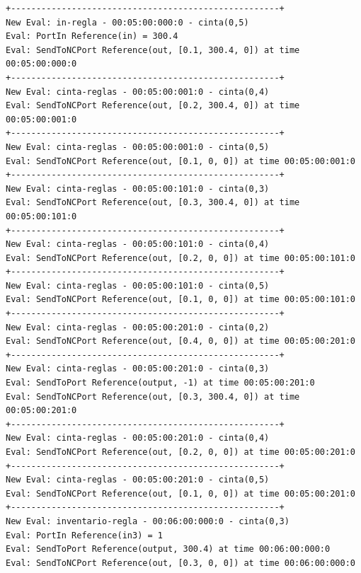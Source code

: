 \documentclass[10pt]{article}
\begin{document}
\begin{minipage}{1\textwidth}
	\centering
	\begin{lstlisting}
+-----------------------------------------------------+
New Eval: in-regla - 00:05:00:000:0 - cinta(0,5)
Eval: PortIn Reference(in) = 300.4
Eval: SendToNCPort Reference(out, [0.1, 300.4, 0]) at time 00:05:00:000:0
+-----------------------------------------------------+
New Eval: cinta-reglas - 00:05:00:001:0 - cinta(0,4)
Eval: SendToNCPort Reference(out, [0.2, 300.4, 0]) at time 00:05:00:001:0
+-----------------------------------------------------+
New Eval: cinta-reglas - 00:05:00:001:0 - cinta(0,5)
Eval: SendToNCPort Reference(out, [0.1, 0, 0]) at time 00:05:00:001:0
+-----------------------------------------------------+
New Eval: cinta-reglas - 00:05:00:101:0 - cinta(0,3)
Eval: SendToNCPort Reference(out, [0.3, 300.4, 0]) at time 00:05:00:101:0
+-----------------------------------------------------+
New Eval: cinta-reglas - 00:05:00:101:0 - cinta(0,4)
Eval: SendToNCPort Reference(out, [0.2, 0, 0]) at time 00:05:00:101:0
+-----------------------------------------------------+
New Eval: cinta-reglas - 00:05:00:101:0 - cinta(0,5)
Eval: SendToNCPort Reference(out, [0.1, 0, 0]) at time 00:05:00:101:0
+-----------------------------------------------------+
New Eval: cinta-reglas - 00:05:00:201:0 - cinta(0,2)
Eval: SendToNCPort Reference(out, [0.4, 0, 0]) at time 00:05:00:201:0
+-----------------------------------------------------+
New Eval: cinta-reglas - 00:05:00:201:0 - cinta(0,3)
Eval: SendToPort Reference(output, -1) at time 00:05:00:201:0
Eval: SendToNCPort Reference(out, [0.3, 300.4, 0]) at time 00:05:00:201:0
+-----------------------------------------------------+
New Eval: cinta-reglas - 00:05:00:201:0 - cinta(0,4)
Eval: SendToNCPort Reference(out, [0.2, 0, 0]) at time 00:05:00:201:0
+-----------------------------------------------------+
New Eval: cinta-reglas - 00:05:00:201:0 - cinta(0,5)
Eval: SendToNCPort Reference(out, [0.1, 0, 0]) at time 00:05:00:201:0
+-----------------------------------------------------+
New Eval: inventario-regla - 00:06:00:000:0 - cinta(0,3)
Eval: PortIn Reference(in3) = 1
Eval: SendToPort Reference(output, 300.4) at time 00:06:00:000:0
Eval: SendToNCPort Reference(out, [0.3, 0, 0]) at time 00:06:00:000:0
	\end{lstlisting}	
\end{minipage}
\end{document}
